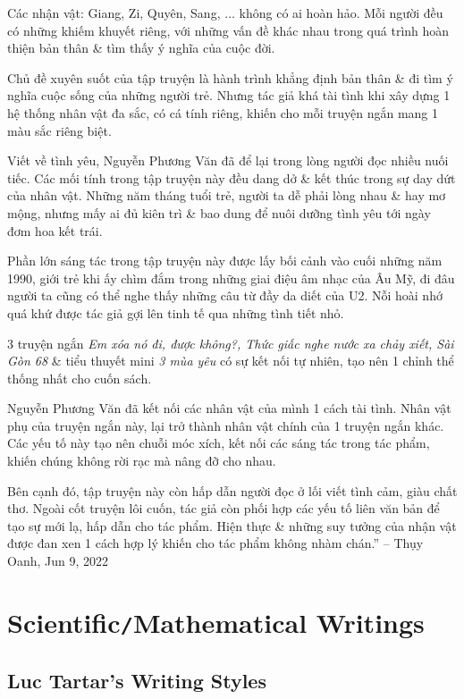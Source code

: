 \documentclass[oneside]{book}
\numberwithin{equation}{section}
\begin{document}
Các nhận vật: Giang, Zi, Quyên, Sang, $\ldots$ không có ai hoàn hảo. Mỗi người đều có những khiếm khuyết riêng, với những vấn đề khác nhau trong quá trình hoàn thiện bản thân \& tìm thấy ý nghĩa của cuộc đời.

Chủ đề xuyên suốt của tập truyện là hành trình khẳng định bản thân \& đi tìm ý nghĩa cuộc sống của những người trẻ. Nhưng tác giả khá tài tình khi xây dựng 1 hệ thống nhân vật đa sắc, có cá tính riêng, khiến cho mỗi truyện ngắn mang 1 màu sắc riêng biệt.

Viết về tình yêu, Nguyễn Phương Văn đã để lại trong lòng người đọc nhiều nuối tiếc. Các mối tính trong tập truyện này đều dang dở \& kết thúc trong sự day dứt của nhân vật. Những năm tháng tuổi trẻ, người ta dễ phải lòng nhau \& hay mơ mộng, nhưng mấy ai đủ kiên trì \& bao dung để nuôi dưỡng tình yêu tới ngày đơm hoa kết trái.

Phần lớn sáng tác trong tập truyện này được lấy bối cảnh vào cuối những năm 1990, giới trẻ khi ấy chìm đắm trong những giai điệu âm nhạc của Âu Mỹ, đi đâu người ta cũng có thể nghe thấy những câu từ đầy da diết của U2. Nỗi hoài nhớ quá khứ được tác giả gợi lên tinh tế qua những tình tiết nhỏ.

3 truyện ngắn \textit{Em xóa nó đi, được không?, Thức giấc nghe nước xa chảy xiết, Sài Gòn 68} \& tiểu thuyết mini \textit{3 mùa yêu} có sự kết nối tự nhiên, tạo nên 1 chỉnh thể thống nhất cho cuốn sách.

Nguyễn Phương Văn đã kết nối các nhân vật của mình 1 cách tài tình. Nhân vật phụ của truyện ngắn này, lại trở thành nhân vật chính của 1 truyện ngắn khác. Các yếu tố này tạo nên chuỗi móc xích, kết nối các sáng tác trong tác phẩm, khiến chúng không rời rạc mà nâng đỡ cho nhau.

Bên cạnh đó, tập truyện này còn hấp dẫn người đọc ở lối viết tình cảm, giàu chất thơ. Ngoài cốt truyện lôi cuốn, tác giả còn phối hợp các yếu tố liên văn bản để tạo sự mới lạ, hấp dẫn cho tác phẩm. Hiện thực \& những suy tưởng của nhận vật được đan xen 1 cách hợp lý khiến cho tác phẩm không nhàm chán.'' -- Thụy Oanh, Jun 9, 2022


\part{Scientific\texttt{/}Mathematical Writings}

\chapter{Luc Tartar's Writing Styles}
\end{document}
